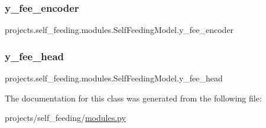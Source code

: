 \subsubsection{\texorpdfstring{y\+\_\+fee\+\_\+encoder}{y\_fee\_encoder}}
{\footnotesize\ttfamily projects.\+self\+\_\+feeding.\+modules.\+Self\+Feeding\+Model.\+y\+\_\+fee\+\_\+encoder}

\mbox{\label{classprojects_1_1self__feeding_1_1modules_1_1SelfFeedingModel_a6f4541b0ea2e461e61b922ef48c5a334}} 
\subsubsection{\texorpdfstring{y\+\_\+fee\+\_\+head}{y\_fee\_head}}
{\footnotesize\ttfamily projects.\+self\+\_\+feeding.\+modules.\+Self\+Feeding\+Model.\+y\+\_\+fee\+\_\+head}



The documentation for this class was generated from the following file\+:\begin{DoxyCompactItemize}
\item 
projects/self\+\_\+feeding/\hyperlink{projects_2self__feeding_2modules_8py}{modules.\+py}\end{DoxyCompactItemize}
